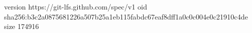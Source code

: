 version https://git-lfs.github.com/spec/v1
oid sha256:b3c2a0875681226a507b25a1eb115fabdc67eaf8dff1a0c0c004e0c21910c4de
size 174916
